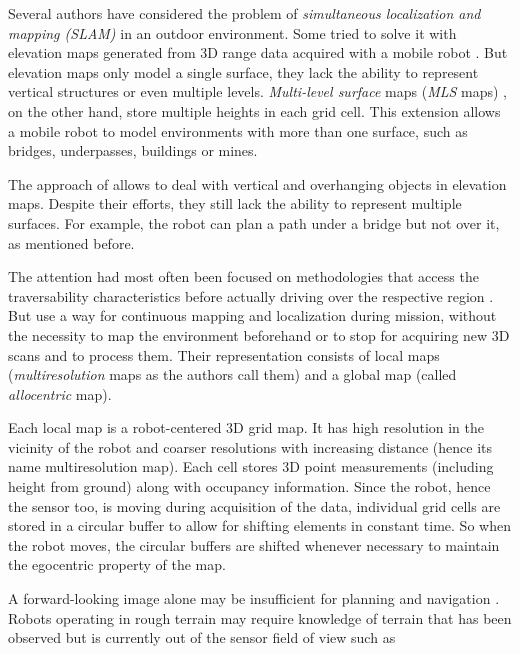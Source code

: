 \documentclass[12pt,a4paper]{report}
\newcommand{\term}{\textit}
\newcommand{\acronym}{\MakeUppercase}
\begin{document}
	Several authors have considered the problem of \term{simultaneous localization 
	and mapping (\acronym{slam})} in an outdoor environment. Some tried to solve it 
	with elevation maps generated from \acronym{3d} range data acquired with a mobile 
	robot \citep{Pfaff}. But elevation maps only model a single surface, they lack the 
	ability to represent vertical structures or even multiple levels. \term{Multi-level 
	surface} maps (\term{\acronym{mls}} maps) \citep{Triebel}, on the other hand, store 
	multiple heights in each grid cell. This extension allows a mobile robot to model 
	environments with more than one surface, such as bridges, underpasses, buildings 
	or mines. 
	\par
	The approach of \citet{Pfaff} allows to deal with vertical and 
	overhanging objects in elevation maps. Despite their efforts, they still lack 
	the ability to represent multiple surfaces. For example, the robot can plan a 
	path under a bridge but not over it, as mentioned before.
	\par
	The attention had most often been focused on methodologies that access the 
	traversability characteristics before actually driving over the respective region 
	\citep{Papadakis}. But \citet{Droeschel} use a way for continuous mapping and 
	localization during mission, without the necessity to map the environment 
	beforehand or to stop for acquiring new \acronym{3d} scans and to process them. 
	Their representation consists of local maps (\term{multiresolution} maps as the 
	authors call them) and a global map (called \term{allocentric} map).
	\par
	Each local map is a robot-centered \acronym{3d} grid map. It has high resolution 
	in the vicinity of the robot and coarser resolutions with increasing distance 
	(hence its name multiresolution map). Each cell stores \acronym{3d} point 
	measurements (including height from ground) along with occupancy information. 
	Since the robot, hence the sensor too, is moving during acquisition of the data, 
	individual grid cells are stored in a circular buffer to allow for shifting 
	elements in constant time. So when the robot moves, the circular buffers are 
	shifted whenever necessary to maintain the egocentric property of the map.
	\par
	A forward-looking image alone may be insufficient for planning and navigation 
	\citep{Kweon}. Robots operating in rough terrain may require knowledge of terrain 
	that has been observed but is currently out of the sensor field of view such as 
\end{document}
